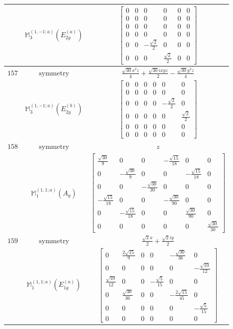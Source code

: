 \documentclass[fleqn,8pt,landscape]{jsarticle}
\begin{document}
\begin{longtable}{ccc}
$  $ & $ \mathbb{M}_{3}^{(1,-1;a)}(E_{2g}^{(a)}) $ & $ \begin{bmatrix} 0 & 0 & 0 & 0 & 0 & 0 \\ 0 & 0 & 0 & 0 & 0 & 0 \\ 0 & 0 & 0 & 0 & 0 & 0 \\ 0 & 0 & 0 & 0 & 0 & 0 \\ 0 & 0 & - \frac{\sqrt{2}}{2} & 0 & 0 & 0 \\ 0 & 0 & 0 & \frac{\sqrt{2}}{2} & 0 & 0 \end{bmatrix} $ \\ \hline
$ 157 $ & $ \text{symmetry} $ & $ \frac{\sqrt{30} x^{2} z}{4} + \frac{\sqrt{30} i x y z}{2} - \frac{\sqrt{30} y^{2} z}{4} $ \\
$  $ & $ \mathbb{M}_{3}^{(1,-1;a)}(E_{2g}^{(b)}) $ & $ \begin{bmatrix} 0 & 0 & 0 & 0 & 0 & 0 \\ 0 & 0 & 0 & 0 & 0 & 0 \\ 0 & 0 & 0 & 0 & - \frac{\sqrt{2}}{2} & 0 \\ 0 & 0 & 0 & 0 & 0 & \frac{\sqrt{2}}{2} \\ 0 & 0 & 0 & 0 & 0 & 0 \\ 0 & 0 & 0 & 0 & 0 & 0 \end{bmatrix} $ \\ \hline
$ 158 $ & $ \text{symmetry} $ & $ z $ \\
$  $ & $ \mathbb{M}_{1}^{(1,1;a)}(A_{g}) $ & $ \begin{bmatrix} \frac{\sqrt{30}}{9} & 0 & 0 & - \frac{\sqrt{15}}{18} & 0 & 0 \\ 0 & - \frac{\sqrt{30}}{9} & 0 & 0 & - \frac{\sqrt{15}}{18} & 0 \\ 0 & 0 & - \frac{\sqrt{30}}{30} & 0 & 0 & 0 \\ - \frac{\sqrt{15}}{18} & 0 & 0 & - \frac{\sqrt{30}}{90} & 0 & 0 \\ 0 & - \frac{\sqrt{15}}{18} & 0 & 0 & \frac{\sqrt{30}}{90} & 0 \\ 0 & 0 & 0 & 0 & 0 & \frac{\sqrt{30}}{30} \end{bmatrix} $ \\ \hline
$ 159 $ & $ \text{symmetry} $ & $ \frac{\sqrt{2} x}{2} + \frac{\sqrt{2} i y}{2} $ \\
$  $ & $ \mathbb{M}_{1}^{(1,1;a)}(E_{1g}^{(a)}) $ & $ \begin{bmatrix} 0 & \frac{2 \sqrt{15}}{9} & 0 & 0 & - \frac{\sqrt{30}}{36} & 0 \\ 0 & 0 & 0 & 0 & 0 & - \frac{\sqrt{10}}{12} \\ \frac{\sqrt{10}}{12} & 0 & 0 & - \frac{\sqrt{5}}{15} & 0 & 0 \\ 0 & \frac{\sqrt{30}}{36} & 0 & 0 & - \frac{2 \sqrt{15}}{45} & 0 \\ 0 & 0 & 0 & 0 & 0 & - \frac{\sqrt{5}}{15} \\ 0 & 0 & 0 & 0 & 0 & 0 \end{bmatrix} $ \\ \hline

\end{longtable}
\end{document}
